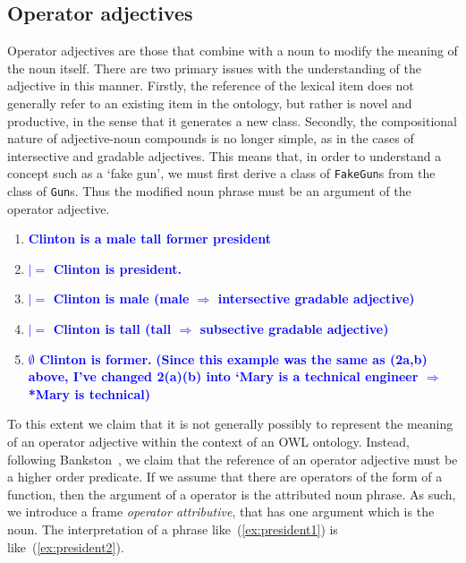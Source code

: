 \documentclass[11pt]{article}
\begin{document}
\subsection{Operator adjectives} \label{sec:operators}

Operator adjectives are those that combine with a noun to modify the meaning of the noun itself. 
There are two primary issues with the understanding of the adjective in this manner. 
Firstly, the reference of the lexical item does not generally refer to an existing item 
in the ontology, but rather is novel and productive, in the sense that it generates a new class. Secondly, the compositional nature 
of adjective-noun compounds is no longer simple, as in the cases of intersective and gradable adjectives.
This means that, in order to understand a concept such as a `fake gun', we must first
derive a class of {\tt FakeGun}s from the class of {\tt Gun}s. Thus the modified noun phrase
must be an argument of the operator adjective.

\begin{enumerate}
\item \textbf{\textcolor{blue}{Clinton is a male tall former president}} \label{ex:clinton}
\item \textbf{\textcolor{blue}{$ |= $ Clinton is president.}}
\item \textbf{\textcolor{blue}{$ |= $ Clinton is male (male $\Rightarrow$ intersective gradable adjective)}}
\item \textbf{\textcolor{blue}{$ |= $ Clinton is tall (tall $ \Rightarrow$ subsective gradable adjective)}}
\item \textbf{\textcolor{blue}{$\emptyset$ Clinton is former.}} \textbf{\textcolor{blue}{(Since this example was the same as (2a,b) above, I've changed 2(a)(b) into `Mary is a technical engineer $\Rightarrow$ *Mary is technical)}}
\end{enumerate}

To this extent we claim that it is not generally possibly to represent the 
meaning of an operator adjective within the context of an OWL ontology.
Instead, following Bankston~\cite{bankston2003modeling}, we claim that
the reference of an operator adjective must be a higher order predicate.
If we assume that there are operators of the form of a function, then
the argument of a operator is the attributed noun phrase. As such, we introduce a frame \emph{operator attributive}, that has one argument
which is the noun. The interpretation of a phrase like~(\ref{ex:president1}) is like~(\ref{ex:president2}).
\end{document}
